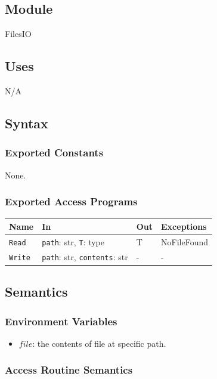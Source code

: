 \documentclass[12pt, titlepage]{article}
\begin{document}
\subsection{Module}

FilesIO

\subsection{Uses}

N/A

\subsection{Syntax}

\subsubsection{Exported Constants}

None.

\subsubsection{Exported Access Programs}

\begin{center}
\begin{tabular}{p{4cm} p{4cm} p{4cm} p{2cm}}
\hline
\textbf{Name} & \textbf{In} & \textbf{Out} & \textbf{Exceptions} \\
\hline
\texttt{Read} & \texttt{path}: str, \texttt{T}: type & T & NoFileFound \\
\texttt{Write} & \texttt{path}: str, \texttt{contents}: str & - & - \\
\hline
\end{tabular}
\end{center}

\subsection{Semantics}

\subsubsection{Environment Variables}
\begin{itemize}
\item $file$: the contents of file at specific path. 
\end{itemize}

\subsubsection{Access Routine Semantics}
\end{document}
